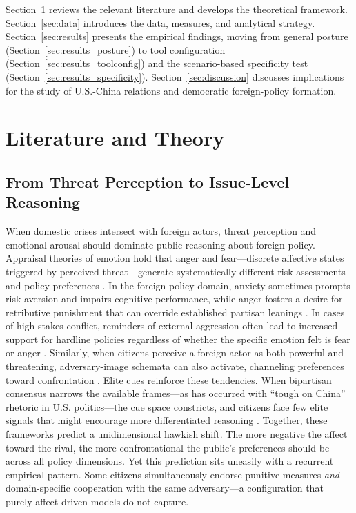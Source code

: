 \documentclass[12pt,letterpaper]{article}
\begin{document}
Section~\ref{sec:theory} reviews the relevant literature and develops the theoretical framework. Section~\ref{sec:data} introduces the data, measures, and analytical strategy. Section~\ref{sec:results} presents the empirical findings, moving from general posture (Section~\ref{sec:results_posture}) to tool configuration (Section~\ref{sec:results_toolconfig}) and the scenario-based specificity test (Section~\ref{sec:results_specificity}). Section~\ref{sec:discussion} discusses implications for the study of U.S.-China relations and democratic foreign-policy formation.

\section{Literature and Theory}
\label{sec:theory}

\subsection{From Threat Perception to Issue-Level Reasoning}
\label{sec:theory_literature}

When domestic crises intersect with foreign actors, threat perception and emotional arousal should dominate public reasoning about foreign policy. Appraisal theories of emotion hold that anger and fear---discrete affective states triggered by perceived threat---generate systematically different risk assessments and policy preferences \citep{marcus_affective_2000, lerner_fear_2001, herrmann_how_2017, renshon_emotions_2017}. In the foreign policy domain, anxiety sometimes prompts risk aversion and impairs cognitive performance, while anger fosters a desire for retributive punishment that can override established partisan leanings \citep{brader_what_2008, huddy_threat_2005, wayne_terrified_2023}. In cases of high-stakes conflict, reminders of external aggression often lead to increased support for hardline policies regardless of whether the specific emotion felt is fear or anger \citep{kupatadze_shadow_2021}. Similarly, when citizens perceive a foreign actor as both powerful and threatening, adversary-image schemata can also activate, channeling preferences toward confrontation \citep{herrmann_mass_1999}. Elite cues reinforce these tendencies. When bipartisan consensus narrows the available frames---as has occurred with ``tough on China'' rhetoric in U.S. politics---the cue space constricts, and citizens face few elite signals that might encourage more differentiated reasoning \citep{zaller_nature_1992}. Together, these frameworks predict a unidimensional hawkish shift. The more negative the affect toward the rival, the more confrontational the public's preferences should be across all policy dimensions. Yet this prediction sits uneasily with a recurrent empirical pattern. Some citizens simultaneously endorse punitive measures \emph{and} domain-specific cooperation with the same adversary---a configuration that purely affect-driven models do not capture.
\end{document}
